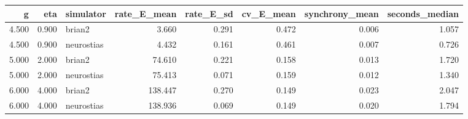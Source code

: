 \begin{tabular}{rrlrrrrr}
\toprule
g & eta & simulator & rate_E_mean & rate_E_sd & cv_E_mean & synchrony_mean & seconds_median \\
\midrule
4.500 & 0.900 & brian2 & 3.660 & 0.291 & 0.472 & 0.006 & 1.057 \\
4.500 & 0.900 & neurostias & 4.432 & 0.161 & 0.461 & 0.007 & 0.726 \\
5.000 & 2.000 & brian2 & 74.610 & 0.221 & 0.158 & 0.013 & 1.720 \\
5.000 & 2.000 & neurostias & 75.413 & 0.071 & 0.159 & 0.012 & 1.340 \\
6.000 & 4.000 & brian2 & 138.447 & 0.270 & 0.149 & 0.023 & 2.047 \\
6.000 & 4.000 & neurostias & 138.936 & 0.069 & 0.149 & 0.020 & 1.794 \\
\bottomrule
\end{tabular}
